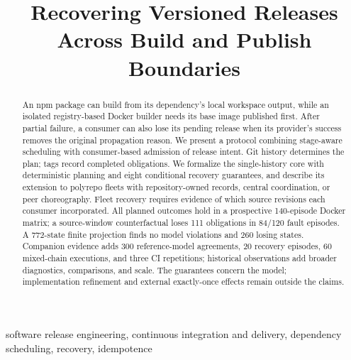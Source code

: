 \documentclass[10pt,conference]{IEEEtran}
\theoremstyle{definition}
\begin{document}
\title{Recovering Versioned Releases Across Build and Publish Boundaries}
\maketitle
\begin{abstract}
An npm package can build from its dependency's local workspace output, while
an isolated registry-based Docker builder needs its base image published
first. After partial failure, a consumer can also
lose its pending release when its provider's success removes the original
propagation reason. We present a protocol combining stage-aware scheduling
with consumer-based admission of release intent. Git history determines the
plan; tags record completed obligations. We formalize the single-history core
with deterministic planning and eight conditional recovery guarantees, and
describe its extension to polyrepo fleets with repository-owned records,
central coordination, or peer choreography. Fleet recovery requires evidence
of which source revisions each consumer incorporated.
All planned outcomes hold in a prospective 140-episode Docker matrix; a
source-window counterfactual loses 111 obligations in 84/120 fault episodes.
A 772-state finite projection finds no model violations and 260 losing states.
Companion evidence adds 300 reference-model agreements, 20 recovery
episodes, 60 mixed-chain executions, and three CI repetitions; historical
observations add broader diagnostics, comparisons, and scale. The guarantees
concern the model; implementation refinement and external exactly-once effects
remain outside the claims.
\end{abstract}
\begin{IEEEkeywords}
software release engineering, continuous integration and delivery,
dependency scheduling, recovery, idempotence
\end{IEEEkeywords}






\clearpage
{}

\end{document}
